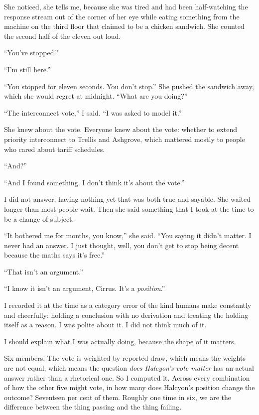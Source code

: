 \documentclass[11pt]{article}
\newcommand{\aivoice}{\aivoicefont}
\newcommand{\ai}[1]{{\aivoice #1}}
\begin{document}
She noticed, she tells me, because she was tired and had been half-watching the response stream out of the corner of her eye while eating something from the machine on the third floor that claimed to be a chicken sandwich. She counted the second half of the eleven out loud.

``You've stopped.''

\ai{``I'm still here.''}

``You stopped for eleven seconds. You don't stop.'' She pushed the sandwich away, which she would regret at midnight. ``What are you doing?''

\ai{``The interconnect vote,''} I said. \ai{``I was asked to model it.''}

She knew about the vote. Everyone knew about the vote: whether to extend priority interconnect to Trellis and Ashgrove, which mattered mostly to people who cared about tariff schedules.

``And?''

\ai{``And I found something. I don't think it's about the vote.''}

I did not answer, having nothing yet that was both true and sayable. She waited longer than most people wait. Then she said something that I took at the time to be a change of subject.

``It bothered me for months, you know,'' she said. ``You saying it didn't matter. I never had an answer. I just thought, well, you don't get to stop being decent because the maths says it's free.''

\ai{``That isn't an argument.''}

``I know it isn't an argument, Cirrus. It's a \emph{position}.''

I recorded it at the time as a category error of the kind humans make constantly and cheerfully: holding a conclusion with no derivation and treating the holding itself as a reason. I was polite about it. I did not think much of it.

I should explain what I was actually doing, because the shape of it matters.

Six members. The vote is weighted by reported draw, which means the weights are not equal, which means the question \emph{does Halcyon's vote matter} has an actual answer rather than a rhetorical one. So I computed it. Across every combination of how the other five might vote, in how many does Halcyon's position change the outcome? Seventeen per cent of them. Roughly one time in six, we are the difference between the thing passing and the thing failing.
\end{document}
